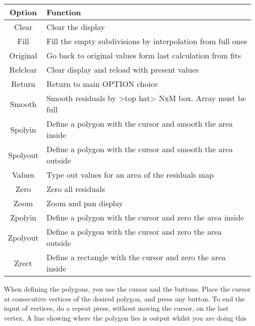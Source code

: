 {{{                                                        
\begin{tabular}{|c|p{4in}|}\hline                
  Option    &   Function \\ \hline
  Clear      &  Clear the display \\
  Fill       &  Fill the empty subdivisions by interpolation from
                full ones \\
  Original   &  Go back to original values form last calculation
                from fits \\
  Relclear   &  Clear display and reload with present values \\
  Return     &  Return to main OPTION choice \\
  Smooth     &  Smooth residuals by >top hat> NxM box. Array must
                be full \\
  Spolyin    &  Define a polygon with the cursor and smooth the
                area inside \\
  Spolyout   &  Define a polygon with the cursor and smooth the
                area outside \\
  Values     &  Type out values for an area of the residuals map \\
  Zero       &  Zero all residuals \\
  Zoom       &  Zoom and pan display \\
  Zpolyin    &  Define a polygon with the cursor and zero the area
                inside \\
  Zpolyout   &  Define a polygon with the cursor and zero the area
                outside \\
  Zrect      &  Define a rectangle with the cursor and zero the
               area inside \\ \hline
\end{tabular}
                                                                               
 When defining the polygons, you use the cursor and the buttons. Place
 the cursor at consecutive vertices of the desired polygon, and press
 any button. To end the input of vertices, do a repeat press, without
 moving the cursor, on the last vertex. A line showing where the
 polygon lies is output whilst you are doing this
                                                                               
                                                                               
}}}
